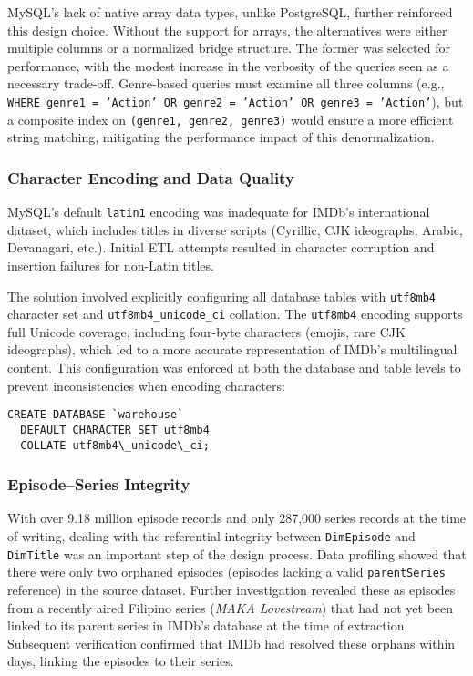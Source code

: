 MySQL's lack of native array data types, unlike PostgreSQL, further reinforced this design choice. Without the support for arrays, the alternatives were either multiple columns or a normalized bridge structure. The former was selected for performance, with the modest increase in the verbosity of the queries seen as a necessary trade-off. Genre-based queries must examine all three columns (e.g., \texttt{WHERE genre1 = 'Action' OR genre2 = 'Action' OR genre3 = 'Action'}), but a composite index on \texttt{(genre1, genre2, genre3)} would ensure a more efficient string matching, mitigating the performance impact of this denormalization.

\subsubsection{Character Encoding and Data Quality}

MySQL's default \texttt{latin1} encoding was inadequate for IMDb's international dataset, which includes titles in diverse scripts (Cyrillic, CJK ideographs, Arabic, Devanagari, etc.). Initial ETL attempts resulted in character corruption and insertion failures for non-Latin titles.

The solution involved explicitly configuring all database tables with \texttt{utf8mb4} character set and \texttt{utf8mb4\_unicode\_ci} collation. The \texttt{utf8mb4} encoding supports full Unicode coverage, including four-byte characters (emojis, rare CJK ideographs), which led to a more accurate representation of IMDb's multilingual content. This configuration was enforced at both the database and table levels to prevent inconsistencies when encoding characters: 

\begin{verbatim}
CREATE DATABASE `warehouse`
  DEFAULT CHARACTER SET utf8mb4
  COLLATE utf8mb4\_unicode\_ci;
\end{verbatim}

\subsubsection{Episode–Series Integrity}

With over 9.18 million episode records and only 287,000 series records at the time of writing, dealing with the referential integrity between \texttt{DimEpisode} and \texttt{DimTitle} was an important step of the design process. Data profiling showed that there were only two orphaned episodes (episodes lacking a valid \texttt{parentSeries} reference) in the source dataset. Further investigation revealed these as episodes from a recently aired Filipino series (\textit{MAKA Lovestream}) that had not yet been linked to its parent series in IMDb's database at the time of extraction. Subsequent verification confirmed that IMDb had resolved these orphans within days, linking the episodes to their series.

